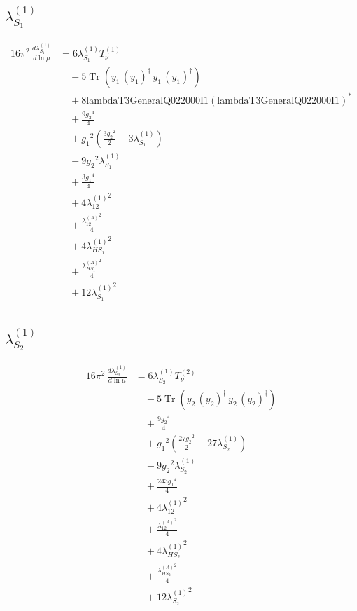 \documentclass[10pt,a4paper]{article}
\begin{document}
\subsection*{$\lambda_{S_1}^{(1)}$}
\begin{align*}
16\pi^2\,\frac{d \lambda_{S_1}^{(1)}}{d\ln\mu} &=6 {\lambda_{S_1}^{(1)}} T_{\nu}^{(1)} \\
&\quad -5 \operatorname{Tr}\!\left({y_1}\,\left({y_1}\right)^{\dagger}\,{y_1}\,\left({y_1}\right)^{\dagger}\right) \\
&\quad +8 \text{lambdaT3GeneralQ022000I1} \left(\text{lambdaT3GeneralQ022000I1}\right)^{*} \\
&\quad +\frac{9 {g_2}^4}{4} \\
&\quad +{g_1}^2 \left(\frac{3 {g_2}^2}{2}-3 {\lambda_{S_1}^{(1)}}\right) \\
&\quad -9 {g_2}^2 {\lambda_{S_1}^{(1)}} \\
&\quad +\frac{3 {g_1}^4}{4} \\
&\quad +4 {\lambda_{12}^{(1)}}^2 \\
&\quad +\frac{{\lambda_{12}^{(A)}}^2}{4} \\
&\quad +4 {\lambda_{HS_1}^{(1)}}^2 \\
&\quad +\frac{{\lambda_{HS_1}^{(A)}}^2}{4} \\
&\quad +12 {\lambda_{S_1}^{(1)}}^2 \\
\end{align*}
\subsection*{$\lambda_{S_2}^{(1)}$}
\begin{align*}
16\pi^2\,\frac{d \lambda_{S_2}^{(1)}}{d\ln\mu} &=6 {\lambda_{S_2}^{(1)}} T_{\nu}^{(2)} \\
&\quad -5 \operatorname{Tr}\!\left({y_2}\,\left({y_2}\right)^{\dagger}\,{y_2}\,\left({y_2}\right)^{\dagger}\right) \\
&\quad +\frac{9 {g_2}^4}{4} \\
&\quad +{g_1}^2 \left(\frac{27 {g_2}^2}{2}-27 {\lambda_{S_2}^{(1)}}\right) \\
&\quad -9 {g_2}^2 {\lambda_{S_2}^{(1)}} \\
&\quad +\frac{243 {g_1}^4}{4} \\
&\quad +4 {\lambda_{12}^{(1)}}^2 \\
&\quad +\frac{{\lambda_{12}^{(A)}}^2}{4} \\
&\quad +4 {\lambda_{HS_2}^{(1)}}^2 \\
&\quad +\frac{{\lambda_{HS_2}^{(A)}}^2}{4} \\
&\quad +12 {\lambda_{S_2}^{(1)}}^2 \\
\end{align*}
\end{document}
